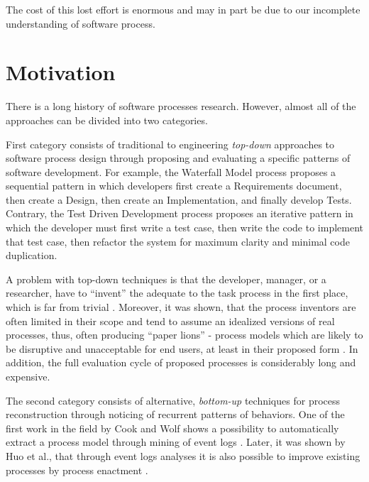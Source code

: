 
The cost of this lost effort is enormous and may in part be due to our incomplete understanding of software process.

\section{Motivation}
There is a long history of software processes research. However, almost all of the approaches can be divided
into two categories.

First category consists of traditional to engineering \textit{top-down} approaches to software process 
design through proposing and evaluating a specific patterns of software development. 
For example, the Waterfall Model process proposes a sequential pattern in which 
developers first create a Requirements document, then create a Design, then create an Implementation, and 
finally develop Tests. Contrary, the Test Driven Development process proposes an iterative pattern in which the
developer must first write a test case, then write the code to implement that test case, then refactor the system for
maximum clarity and minimal code duplication. 

A problem with top-down techniques is that the developer, manager, or a researcher, have to ``invent'' the adequate to
the task process in the first place, which is far from trivial \cite{citeulike:5043104} \cite{citeulike:1986013}. 
Moreover, it was shown, that the process inventors are often limited in their scope and tend to assume an idealized
versions of real processes, thus, often producing ``paper lions''
- process models which are likely to be disruptive and unacceptable for end users, at least in their proposed form
\cite{citeulike:9758924}. In addition, the full evaluation cycle of proposed processes is considerably long and
expensive.

The second category consists of alternative, \textit{bottom-up} techniques for process reconstruction through
noticing of recurrent patterns of behaviors. One of the first work in the field by Cook and Wolf
shows a possibility to automatically extract a process model through mining of event logs
\cite{citeulike:328044} \cite{citeulike:5120757} \cite{citeulike:5128143}. Later, it was shown by Huo et al., that
through event logs analyses it is also possible to improve existing processes by process enactment
\cite{citeulike:7691059} \cite{citeulike:7690766}. 

